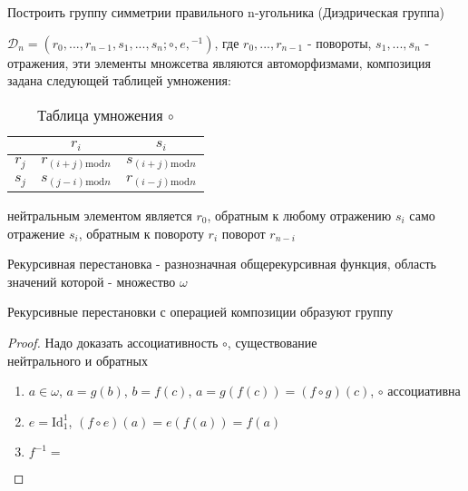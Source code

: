 \documentclass[../main/document.tex]{subfiles}
\begin{document}
\begin{exm}
Построить группу симметрии правильного n-угольника (Диэдрическая группа)

$\mathcal{D}_n=({r_0,...,r_{n-1},s_1,...,s_n};\circ,e,{ }^{-1})$, где $r_0,...,r_{n-1}$ - повороты, $s_1,...,s_n$ - отражения, эти элементы множсетва являются автоморфизмами, композиция задана следующей таблицей умножения:
\begin{table}[H]
\centering
\caption*{Таблица умножения $\circ$}
\renewcommand*{\arraystretch}{1.4}
\begin{tabular}{c|c|c}
  & $r_i$ & $s_i$   \\ \hline
$r_j$ & $r_{(i+j)\mathrm{mod}n}$ & $s_{(i+j)\mathrm{mod}n}$  \\ \hline
$s_j$ & $s_{(j-i)\mathrm{mod}n}$ & $r_{(i-j)\mathrm{mod}n}$ \\
\end{tabular}
\end{table}
нейтральным элементом является $r_0$, обратным к любому отражению $s_i$ само отражение $s_i$, обратным к повороту $r_i$ поворот $r_{n-i}$
\end{exm}
\begin{dfn}
Рекурсивная перестановка - разнозначная общерекурсивная функция, область значений которой - множество $\omega$ 
\end{dfn}
\begin{thm}
Рекурсивные перестановки с операцией композиции образуют группу

\begin{proof}
Надо доказать ассоциативность $\circ$, существование\\ нейтрального и обратных

\begin{enumerate}
\item $a\in \omega$, $a=g(b)$, $b=f(c)$, $a=g(f(c))=(f\circ g)(c)$, $\circ$ ассоциативна
\item $e=\mathrm{Id}^1_1$, $(f\circ e)(a)=e(f(a))=f(a)$
\item $f^{-1}=$
\end{enumerate}
\end{proof}
\end{thm}
\end{document}
